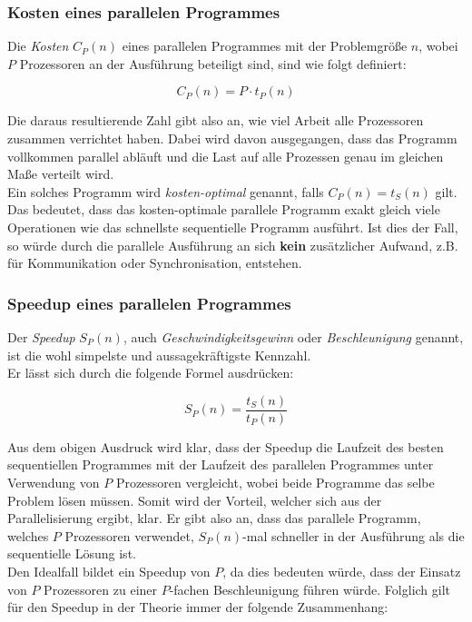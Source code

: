 			\subsubsection{Kosten eines parallelen Programmes}
			
				Die \textit{Kosten} $C_P(n)$ eines parallelen Programmes mit der Problemgröße $n$, wobei $P$ Prozessoren an der Ausführung beteiligt sind, sind wie folgt definiert:
				
				\[ C_P(n) = P \cdot t_P(n) \]
				
				Die daraus resultierende Zahl gibt also an, wie viel Arbeit alle Prozessoren zusammen verrichtet haben. Dabei wird davon ausgegangen, dass das Programm vollkommen parallel abläuft und die Last auf alle Prozessen genau im gleichen Maße verteilt wird.\\
				Ein solches Programm wird \textit{kosten-optimal} genannt, falls $C_P(n) = t_S(n)$ gilt. Das bedeutet, dass das kosten-optimale parallele Programm exakt gleich viele Operationen wie das schnellste sequentielle Programm ausführt. Ist dies der Fall, so würde durch die parallele Ausführung an sich \textbf{kein} zusätzlicher Aufwand, z.B. für Kommunikation oder Synchronisation, entstehen. \cite{ParaProgRauber}
				
			\subsubsection{Speedup eines parallelen Programmes}
				\label{Speedup}
			
				Der \textit{Speedup} $S_P(n)$, auch \textit{Geschwindigkeitsgewinn} oder \textit{Beschleunigung} genannt, ist die wohl simpelste und aussagekräftigste Kennzahl.\\
				Er lässt sich durch die folgende Formel ausdrücken:
				
				\[ S_P(n) = \frac{t_S(n)}{t_P(n)} \]
				
				Aus dem obigen Ausdruck wird klar, dass der Speedup die Laufzeit des besten sequentiellen Programmes mit der Laufzeit des parallelen Programmes unter Verwendung von $P$ Prozessoren vergleicht, wobei beide Programme das selbe Problem lösen müssen. Somit wird der Vorteil, welcher sich aus der Parallelisierung ergibt, klar. Er gibt also an, dass das parallele Programm, welches $P$ Prozessoren verwendet, $S_P(n)$-mal schneller in der Ausführung als die sequentielle Lösung ist.\\
				Den Idealfall bildet ein Speedup von $P$, da dies bedeuten würde, dass der Einsatz von $P$ Prozessoren zu einer $P$-fachen Beschleunigung führen würde. Folglich gilt für den Speedup in der Theorie immer der folgende Zusammenhang:
				

